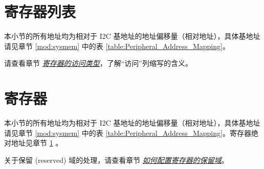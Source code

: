 \documentclass[main\_\_CN.tex]{subfiles}
\begin{document}
\hypertarget{i2c-reg-summ}{}
\section{寄存器列表}\label{sec:i2c-reg-summ}

本小节的所有地址均为相对于 I2C 基地址的地址偏移量（相对地址），具体基地址请见章节 \ref{mod:sysmem} \textit{} 中的表 \ref{table:Peripheral_Address_Mapping}。

请查看章节 \hyperref[glossary-access-types]{\textit{寄存器的访问类型}}，了解“访问”列缩写的含义。




{\clearpage}

\section{寄存器}\label{5.5}

本小节的所有地址均为相对于 I2C 基地址的地址偏移量（相对地址），具体基地址请见章节 \ref{mod:sysmem} \textit{} 中的表 \ref{table:Peripheral_Address_Mapping}。寄存器绝对地址见章节 \ref{sec:i2c-reg-summ} \textit{}。

关于保留 (reserved) 域的处理，请查看章节 \hyperref[programming-reserved-field]{\textit{如何配置寄存器的保留域}}。


\end{document}
